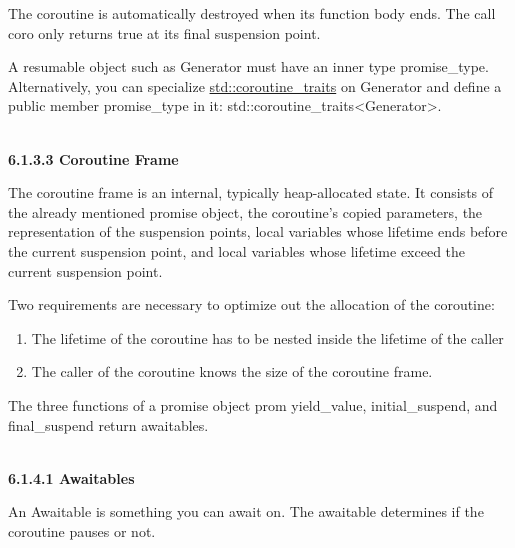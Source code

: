 The coroutine is automatically destroyed when its function body ends. The call coro only returns true at its final suspension point.

\begin{tcolorbox}[breakable,enhanced jigsaw,colback=red!5!white,colframe=red!75!black,title={The resumable object requires an inner type promise\_type}]
A resumable object such as Generator must have an inner type promise\_type. Alternatively, you can specialize \href{https://en.cppreference.com/w/cpp/coroutine/coroutine_traits}{std::coroutine\_traits} on Generator and define a public member promise\_type in it: std::coroutine\_traits<Generator>.
\end{tcolorbox}

\hspace*{\fill} \\ %
\noindent
\textbf{6.1.3.3\hspace{0.2cm} Coroutine Frame}

The coroutine frame is an internal, typically heap-allocated state. It consists of the already mentioned promise object, the coroutine’s copied parameters, the representation of the suspension points, local variables whose lifetime ends before the current suspension point, and local variables whose lifetime exceed the current suspension point.

Two requirements are necessary to optimize out the allocation of the coroutine:

\begin{enumerate}
\item 
The lifetime of the coroutine has to be nested inside the lifetime of the caller

\item 
The caller of the coroutine knows the size of the coroutine frame.

\end{enumerate}


The three functions of a promise object prom yield\_value, initial\_suspend, and final\_suspend return awaitables.

\hspace*{\fill} \\ %
\noindent
\textbf{6.1.4.1\hspace{0.2cm} Awaitables}

An Awaitable is something you can await on. The awaitable determines if the coroutine pauses or not.

